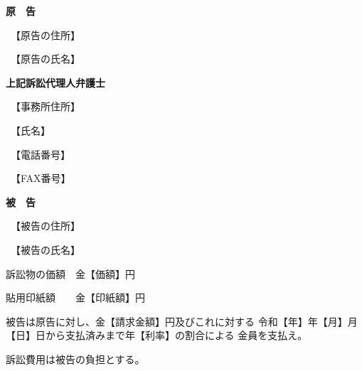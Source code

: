 \documentclass{ltjsarticle}
\begin{document}
\maketitle


\noindent\textbf{原　告}

\noindent{}　【原告の住所】

\noindent{}　【原告の氏名】

\vspace{.5\zw}

\noindent\textbf{上記訴訟代理人弁護士}

\noindent{}　【事務所住所】

\noindent{}　【氏名】

\noindent{}　【電話番号】

\noindent{}　【FAX番号】

\vspace{1\zw}

\noindent\textbf{被　告}

\noindent{}　【被告の住所】

\noindent{}　【被告の氏名】

\vspace{1\zw}


\noindent 訴訟物の価額　金【価額】円

\noindent 貼用印紙額　　金【印紙額】円

\vspace{1\zw}



\SecB{}

被告は原告に対し、金【請求金額】円及びこれに対する
令和【年】年【月】月【日】日から支払済みまで年【利率】の割合による
金員を支払え。

\SecB{}

訴訟費用は被告の負担とする。
\end{document}
